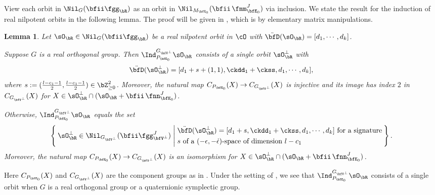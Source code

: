 \documentclass[12pt,a4paper]{amsart}
\numberwithin{equation}{section}
\newtheorem{lem}[thm]{Lemma}
\theoremstyle{remark}
\def\sOpe{\sO^\perp}
\def\sOpeR{\sO^\perp_\bR}
\def\sOR{\sO_\bR}
\def\bfVpe{\bfV^\perp}
\def\bfVn{\bfV^-}
\def\ssD{\ddot{\bfD}}
\begin{document}


View each orbit in $\Nil_G(\bfii \fgg_\bR)$ as an orbit in $\Nil_{M_{\bfE_0}}(\bfii\, \fmm_{\bfE_0}^J)$ via inclusion.
We state the result for the induction of real nilpotent orbits in the following lemma.
The proof will be given in , which is by elementary matrix manipulations.


\begin{lem}\label{lem:indR}
Let $\sOR\in \Nil_G(\bfii\fgg_\bR)$ be a real nilpotent orbit in $\cO$ with $\ssD(\sOR) =
[d_1,\cdots, d_k]$. %
\begin{enumT}
\item \label{it:indR.1}
Suppose $G$ is a real orthogonal group. Then $\Ind_{P_{\bfE_0}}^{G_{\bfVpe}} \sOR$ consists of a single orbit $\sOpeR$ with
\[
\ssD(\sOpeR) = [d_1+s+(1,1), \ckdd_1+\ckss, d_1, \cdots, d_k],
\]
where $s:= (\frac{l-c_1-1}{2},\frac{l-c_1-1}{2})\in \bZ_{\geq 0}^2$. %
Moreover, the natural map $C_{P_{\bfE_0}}(X) \rightarrow C_{G_{\bfVpe}}(X)$ is
  injective and its image has index $2$ in $C_{G_{\bfVpe}}(X)$ for $X\in \sOpeR \cap (\sOR+\bfii\, \fnn_{\bfE_0}^J)$.
\item
\label{it:indR.2}
Otherwise, $
  \Ind_{P_{\bfE_0}}^{G_{\bfVpe}} \sOR$ equals the set
  \[
    \Set{
      \sOpeR \in \Nil_{G_{\bfVpe}}(\bfii \fgg_{\bfVpe}^J)|\begin{aligned} &\ssD(\sOpeR) =  [d_1+s, \ckdd_1+\ckss, d_1, \cdots, d_k] \text{ for a signature} \\
      &\text{$s$ of a $(-\epsilon, -\dot \epsilon)$-space of dimension $l-c_1$}\end{aligned}}.
  \]Moreover, the natural map
  $C_{P_{\bfE_0}}(X) \rightarrow C_{G_{\bfVpe}}(X)$ is an isomorphism for $X\in \sOpeR\cap (\sOR+\bfii \,\fnn_{\bfE_0}^J)$.
\end{enumT}
\end{lem}

Here $C_{P_{\bfE_0}}(X)$ and $C_{G_{\bfVpe}}(X)$ are the component groups as in .
Under the setting of , we see that $\Ind_{P_{\bfE_0}}^{G_{\bfVpe}} \sOR$ consists of a single orbit when $G$ is a
real orthogonal group or a quaternionic symplectic group.
\end{document}
